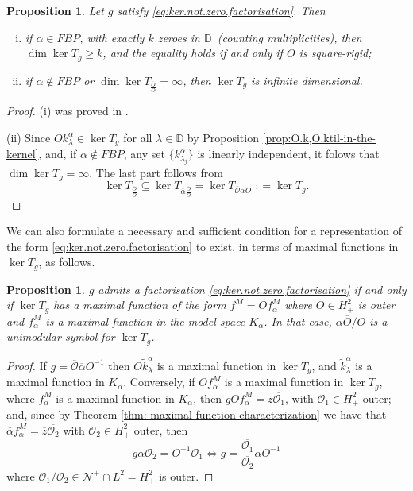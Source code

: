 \documentclass[12pt]{elsarticle}
\numberwithin{equation}{section}
\theoremstyle{plain}
\newtheorem{prop}[thm]{Proposition}
\newcommand{\Hp}{\ensuremath{H^2_+}}
\newcommand{\DD}{\ensuremath{\mathbb{D}}}
\newcommand{\OO}{\ensuremath{\mathcal{O}}}
\newcommand{\NN}{\ensuremath{\mathcal{N}^+}}
\newcommand{\ol}[1]{\ensuremath{\overline{#1}}}
\renewcommand{\subset}{\subseteq}
\begin{document}
\begin{prop}
\label{prop:lower.bounds.from.factorisation}
Let $g$ satisfy \eqref{eq:ker.not.zero.factorisation}.
Then
\begin{enumerate}[(i)]
\item if $\alpha\in FBP$, with exactly $k$ zeroes in \DD\ (counting multiplicities), then $\dim\ker T_g \geq k$, and the equality holds if and only if $O$ is square-rigid;

\item if $\alpha\notin FBP$ or $\dim\ker T_{\frac{\ol O}{O}} = \infty$, then $\ker T_g$ is infinite dimensional.
\end{enumerate}
\end{prop}


\begin{proof}
(i) was proved in \cite[Theorem 2.8]{CP18_multipliers}.

(ii) Since $O k_\lambda^\alpha \in \ker T_g$ for all $\lambda\in\DD$ by Proposition \ref{prop:O.k,O.ktil-in-the-kernel}, and, if $\alpha\notin FBP$, any set $\{ k_{\lambda_j}^\alpha \}$ is linearly independent, it folows that $\dim \ker T_g = \infty$.
The last part follows from 
\[
\ker T_\frac{\ol O}{O} \subset \ker T_{\ol\alpha\frac{\ol O}{O}} = \ker T_{\ol\OO\ol\alpha O^{-1}} = \ker T_g.
\]
\end{proof}


We can also formulate a necessary and sufficient condition for a representation of the form \eqref{eq:ker.not.zero.factorisation} to exist, in terms of maximal functions in $\ker T_g$, as follows.

\begin{prop}
\label{prop:not.zero.fact_max.func}
$g$ admits a factorisation \eqref{eq:ker.not.zero.factorisation} if and only if $\ker T_g$ has a maximal function of the form $f^M = O f_\alpha^M$ where $O\in\Hp$ is outer and $f_\alpha^M$ is a maximal function in the model space $K_\alpha$.
In that case, $\ol\alpha \ol O /O$ is a unimodular symbol for $\ker T_g$.
\end{prop}

\begin{proof}
If $g = \ol\OO \ol\alpha O^{-1}$ then $O \tilde k_\lambda^\alpha$ is a maximal function in $\ker T_g$, and $\tilde k_\lambda^\alpha$ is a maximal function in $K_\alpha$.
Conversely, if $O f_\alpha^M$ is a maximal function in $\ker T_g$, where $f_\alpha^M$ is a maximal function in $K_\alpha$, then $g O f_\alpha^M = \ol z \ol{\OO_1}$, with $\OO_1\in\Hp$ outer;
and, since by Theorem \ref{thm: maximal function characterization} we have that $\ol\alpha f_\alpha^M = \ol z \ol{\OO_2}$ with $\OO_2 \in\Hp$ outer, then
\[
g \alpha \ol{\OO_2} = O^{-1} \ol{\OO_1} \iff g = \frac{\ol{\OO_1}}{\ol{\OO_2}} \ol\alpha O^{-1}
\]
where $\OO_1 / \OO_2 \in \NN\cap L^2 = \Hp$ is outer.
\end{proof}
\end{document}
